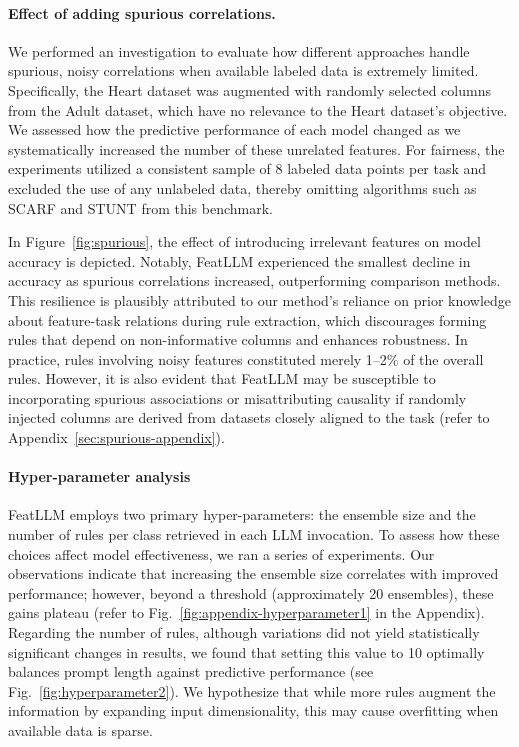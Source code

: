 \paragraph{Effect of adding spurious correlations.} We performed an investigation to evaluate how different approaches handle spurious, noisy correlations when available labeled data is extremely limited. Specifically, the Heart dataset was augmented with randomly selected columns from the Adult dataset, which have no relevance to the Heart dataset’s objective. We assessed how the predictive performance of each model changed as we systematically increased the number of these unrelated features. For fairness, the experiments utilized a consistent sample of 8 labeled data points per task and excluded the use of any unlabeled data, thereby omitting algorithms such as SCARF and STUNT from this benchmark.

In Figure~\ref{fig:spurious}, the effect of introducing irrelevant features on model accuracy is depicted. Notably, \textsf{FeatLLM} experienced the smallest decline in accuracy as spurious correlations increased, outperforming comparison methods. This resilience is plausibly attributed to our method’s reliance on prior knowledge about feature-task relations during rule extraction, which discourages forming rules that depend on non-informative columns and enhances robustness. In practice, rules involving noisy features constituted merely 1–2\% of the overall rules. However, it is also evident that \textsf{FeatLLM} may be susceptible to incorporating spurious associations or misattributing causality if randomly injected columns are derived from datasets closely aligned to the task (refer to Appendix~\ref{sec:spurious-appendix}).

\vspace*{-0.12in}
\paragraph{Hyper-parameter analysis}
\textsf{FeatLLM} employs two primary hyper-parameters: the ensemble size and the number of rules per class retrieved in each LLM invocation. To assess how these choices affect model effectiveness, we ran a series of experiments. Our observations indicate that increasing the ensemble size correlates with improved performance; however, beyond a threshold (approximately 20 ensembles), these gains plateau (refer to Fig.~\ref{fig:appendix-hyperparameter1} in the Appendix). Regarding the number of rules, although variations did not yield statistically significant changes in results, we found that setting this value to 10 optimally balances prompt length against predictive performance (see Fig.~\ref{fig:hyperparameter2}). We hypothesize that while more rules augment the information by expanding input dimensionality, this may cause overfitting when available data is sparse.

